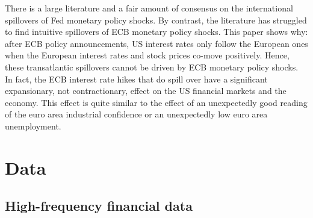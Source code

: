 \documentclass[a4paper,12pt]{article}
\begin{document}
There is a large literature and a fair amount of consensus on the international spillovers of Fed monetary policy shocks.
By contrast, the literature has struggled to find intuitive spillovers of ECB monetary policy shocks.
This paper shows why: after ECB policy announcements, US interest rates only follow the European ones
when the European interest rates and stock prices co-move positively.
Hence, these transatlantic spillovers cannot be driven by ECB monetary policy shocks.
In fact, the ECB interest rate hikes that do spill over have a significant expansionary, not contractionary, effect on the US financial markets and the economy. This effect is quite similar to the effect
of an unexpectedly good reading of the euro area industrial confidence or an unexpectedly low euro area unemployment.



\vspace{2cm}
\clearpage

{}

\appendix

\renewcommand\thesection{Appendix \Alph{section}} \renewcommand{%
\thesubsection}{\Alph{section}.\arabic{subsection}} %
 \renewcommand{\theequation}{%
\Alph{section}.\arabic{equation}}  %
\renewcommand{\thefigure}{\Alph{section}.\arabic{figure}} %
 \renewcommand{\thetable}{\Alph{section}.%
\arabic{table}}

\section{Data}


\subsection{High-frequency financial data}
\end{document}
